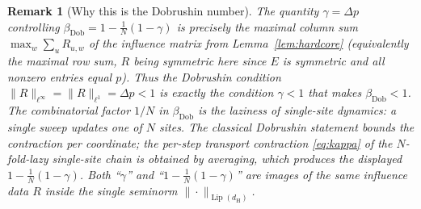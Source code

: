 \documentclass{amsart}
\newtheorem{remark}{Remark}
\DeclareMathOperator{\Lip}{Lip}
\begin{document}
\begin{remark}[Why this is the Dobrushin number]\label{rem:dobrushin}
The quantity $\gamma=\Delta p$ controlling
$\beta_{\mathrm{Dob}}=1-\tfrac1N(1-\gamma)$ is precisely the maximal column sum
$\max_w\sum_u R_{u,w}$ of the influence matrix from Lemma~\ref{lem:hardcore}
(equivalently the maximal row sum, $R$ being symmetric here since $E$ is
symmetric and all nonzero entries equal $p$). Thus the Dobrushin condition
$\|R\|_{\ell^\infty}=\|R\|_{\ell^1}=\Delta p<1$ is exactly the condition
$\gamma<1$ that makes $\beta_{\mathrm{Dob}}<1$. The combinatorial factor $1/N$
in $\beta_{\mathrm{Dob}}$ is the laziness of single-site dynamics: a single
sweep updates one of $N$ sites. The classical Dobrushin statement bounds the
contraction \emph{per coordinate}; the per-step transport contraction
\eqref{eq:kappa} of the $N$-fold-lazy single-site chain is obtained by averaging,
which produces the displayed $1-\tfrac1N(1-\gamma)$. Both ``$\gamma$'' and
``$1-\tfrac1N(1-\gamma)$'' are images of the same influence data $R$ inside the
single seminorm $\|\cdot\|_{\Lip(d_{\mathrm H})}$.
\end{remark}
\end{document}
